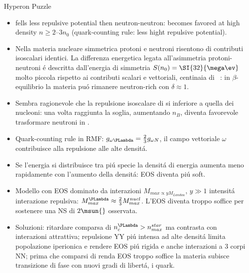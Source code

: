 \begin{frame}{Hyperon Puzzle}
    \begin{itemize}
        \item \PLambda fells less repulsive potential then neutron-neutron: \PLambda becomes favored at high density $n\geq\numrange{2}{3}n_0$ (quark-counting rule: less hight repulsive potential).
        \item Nella materia nucleare simmetrica protoni e neutroni risentono di contributi isoscalari identici. La differenza energetica legata all'asimmetria protoni-neutroni \'e descritta dall'energia di simmetria $S(n_0)=\SI{32}{\mega\ev}$ molto piccola rispetto ai contributi scalari e vettoriali, centinaia di \si{\mega\ev}: in $\beta$-equilibrio la materia pu\'o rimanere neutron-rich con $\delta\approx1$.
        \item Sembra ragionevole che la repulsione isoscalare di \PLambda si inferiore a quella dei nucleoni: una volta raggiunta la soglia, aumentando $n_B$, diventa favorevole trasformare neutroni in \PLambda.
        \item Quark-counting rule in RMF: $g_{\omega\PLambda}=\frac{2}{3}g_{\omega N}$, il campo vettoriale $\omega$ contribuisce alla repulsione alle alte densit\'a.
        \item Se l'energia si distribuisce tra pi\'u specie la densit\'a di energia aumenta meno rapidamente con l'aumento della densit\'a: EOS diventa pi\'u soft.
        \item Modello con EOS dominato da interazioni $M_{max\propto yM_{Landau}}$, $y\gg1$ intensit\'a interazione repulsiva: $M_{max}^{\PLambda}\approx \frac{2}{3}M_{max}^{nucl}$. L'EOS diventa troppo soffice per sostenere una NS di $2\msun{}$ osservata.
        \item Soluzioni: ritardare comparsa di \PLambda $n_c^{\PLambda}>n_{max}^{star}$ ma contrasta con interazioni \PLambda\Pneutron attrattiva; repulsione YY pi\'u intensa ad alte densit\'a limita popolazione iperionica e rendere EOS pi\'u rigida e anche interazioni a 3 corpi NN\PLambda; prima che comparsi di \PLambda renda EOS troppo soffice la materia subisce transizione di fase con nuovi gradi di libert\'a, i quark.
    \end{itemize}
\end{frame}

